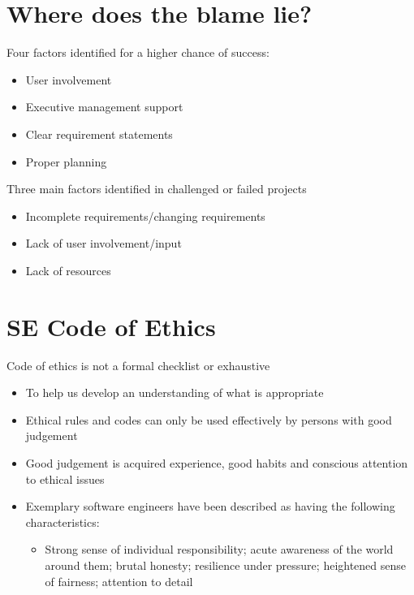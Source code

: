 \documentclass{article}[18pt]
\begin{document}
\section{Where does the blame lie?}
Four factors identified for a higher chance of success:
\begin{itemize}
	\item User involvement
	\item Executive management support
	\item Clear requirement statements
	\item Proper planning
\end{itemize}
Three main factors identified in challenged or failed projects
\begin{itemize}
	\item Incomplete requirements/changing requirements
	\item Lack of user involvement/input
	\item Lack of resources
\end{itemize}
\section{SE Code of Ethics}
Code of ethics is not a formal checklist or exhaustive
\begin{itemize}
	\item To help us develop an understanding of what is appropriate
	\item Ethical rules and codes can only be used effectively by persons with good judgement
	\item Good judgement is acquired experience, good habits and conscious attention to ethical issues
	\item Exemplary software engineers have been described as having the following characteristics:
	\begin{itemize}
		\item Strong sense of individual responsibility; acute awareness of the world around them; brutal honesty; resilience under pressure; heightened sense of fairness; attention to detail
	\end{itemize}
\end{itemize}
\end{document}

